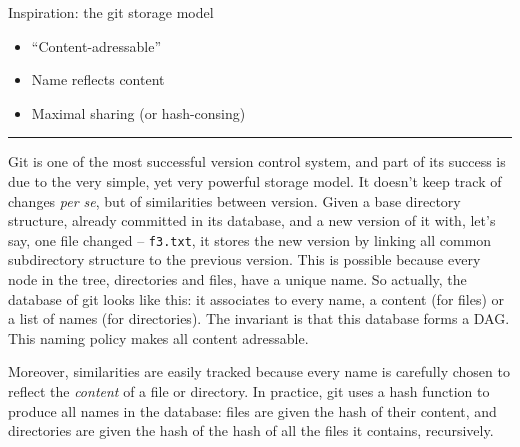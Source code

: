 \documentclass[12pt]{article} \usepackage{beamerarticle} \usepackage{fullpage}
\begin{document}
\begin{frame}{Inspiration: the \textsf{git} storage model}
\begin{center}
\begin{overlayarea}{\textwidth}{12em}
    \end{overlayarea}
  \end{center}%
  \begin{itemize}\small %
  \item<7-> ``Content-adressable''%
  \item<8-> Name reflects content%
  \item<9-> Maximal sharing (or hash-consing)%
  \end{itemize}%
\end{frame}
\hrule

\textsf{Git} is one of the most successful version control system, and
part of its success is due to the very simple, yet very powerful
storage model. It doesn't keep track of changes \emph{per se}, but of
similarities between version. Given a base directory structure,
already committed in its database, and a new version of it with, let's
say, one file changed -- \texttt{f3.txt}, it stores the new version by
linking all common subdirectory structure to the previous version.
This is possible because every node in the tree, directories and
files, have a unique name. So actually, the database of \textsf{git}
looks like this: it associates to every name, a content (for files) or
a list of names (for directories). The invariant is that this database
forms a DAG. This naming policy makes all content adressable.

Moreover, similarities are easily tracked because every name is
carefully chosen to reflect the \emph{content} of a file or directory.
In practice, \textsf{git} uses a hash function to produce all names in
the database: files are given the hash of their content, and
directories are given the hash of the hash of all the files it
contains, recursively.
\end{document}
